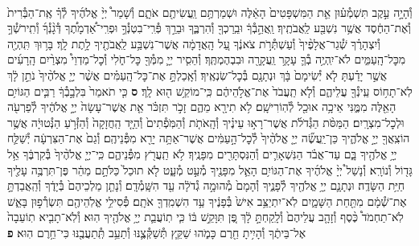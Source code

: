 \documentclass[twoside, openany, parskip=half, 11pt]{book}
\begin{document}
\begin{footnotesize}
\begin{multicols}{2}
\\
וְ֯הָיָ֣ה עֵ֣קֶב תִּשְׁמְ֯ע֗וּן אֵ֤ת הַמִּשְׁפָּטִים֙ הָאֵ֔לֶּה וּשְׁמַרְתֶּ֥ם וַֽעֲשִׂיתֶ֖ם אֹתָ֑ם וְ֯שָׁמַר֩ יְיָ֨ אֱלֹהֶ֜יךָ לְ֯ךָ֗ אֶֽת־הַבְּ֯רִית֙ וְ֯אֶת־הַחֶ֔סֶד אֲשֶׁ֥ר נִשְׁבַּ֖ע לַֽאֲבֹתֶֽיךָ׃ וַֽאֲהֵ֣בְ֯ךָ֔ וּבֵֽרַכְךָ֖ וְ֯הִרְבֶּ֑ךָ וּבֵרַ֣ךְ פְּ֯רִֽי־בִטְנְ֯ךָ֣ וּפְרִֽי־אַ֠דְמָתֶ֠ךָ דְּ֯גָ֨נְ֯ךָ֜ וְ֯תִֽירשְׁ֯ךָ֣ וְ֯יִצְהָרֶ֗ךָ שְׁ֯גַר־אֲלָפֶ֨יךָ֙ וְ֯עַשְׁתְּ֯רֹ֣ת צֹאנֶ֔ךָ עַ֚ל הָֽאֲדָמָ֔ה אֲשֶׁר־נִשְׁבַּ֥ע לַֽאֲבֹתֶ֖יךָ לָ֥תֶת לָֽךְ׃ בָּר֥וּךְ תִּֽהְיֶ֖ה מִכׇּל־הָֽעַמִּ֑ים לֹא־יִֽהְיֶ֥ה בְ֯ךָ֛ עָקָ֥ר וַֽעֲקָרָ֖ה וּבִבְהֶמְתֶּֽךָ׃ וְ֯הֵסִ֧יר יְיָ֛ מִמְּ֯ךָ֖ כׇּל־חֹ֑לִי וְ֯כׇל־מַדְוֵי֩ מִצְרַ֨יִם הָֽרָעִ֜ים אֲשֶׁ֣ר יָדַ֗עְתָּ לֹ֤א יְ֯שִׂימָם֙ בָּ֔ךְ וּנְתָנָ֖ם בְּ֯כׇל־שֽׂנְאֶֽיךָ׃ וְ֯אָֽכַלְתָּ֣ אֶת־כׇּל־הָֽעַמִּ֗ים אֲשֶׁ֨ר יְיָ֤ אֱלֹהֶ֨יךָ֙ נֹתֵ֣ן לָ֔ךְ לֹֽא־תָח֥וֹס עֵֽינְ֯ךָ֖ עֲלֵיהֶ֑ם וְ֯לֹ֤א תַֽעֲבֹד֙ אֶת־אֱלֹ֣הֵיהֶ֔ם כִּֽי־מוֹקֵ֥שׁ ה֖וּא לָֽךְ׃ \textbf{ס} כִּ֤י תֹאמַר֙ בִּלְבָ֣בְ֯ךָ֔ רַבִּ֛ים הַגּוֹיִ֥ם הָאֵ֖לֶּה מִמֶּ֑נִּי אֵיכָ֥ה אוּכַ֖ל לְ֯הֽוֹרִישָֽׁם׃ לֹ֥א תִירָ֖א מֵהֶ֑ם זָכֹ֣ר תִּזְכֹּ֗ר אֵ֤ת אֲשֶׁר־עָשָׂה֙ יְיָ֣ אֱלֹהֶ֔יךָ לְ֯פַרְעֹ֖ה וּלְכׇל־מִצְרָֽיִם׃ הַמַּסֹּ֨ת הַגְּ֯דֹלֹ֜ת אֲשֶׁר־רָא֣וּ עֵינֶ֗יךָ וְ֯הָֽאֹתֹ֤ת וְ֯הַמֹּֽפְ֯תִים֙ וְ֯הַיָּ֤ד הַֽחֲזָקָה֙ וְ֯הַזְּ֯רֹ֣עַ הַנְּ֯טוּיָ֔ה אֲשֶׁ֥ר הוֹצִֽאֲךָ֖ יְיָ֣ אֱלֹהֶ֑יךָ כֵּן־יַֽעֲשֶׂ֞ה יְיָ֤ אֱלֹהֶ֨יךָ֙ לְ֯כׇל־הָ֣עַמִּ֔ים אֲשֶׁר־אַתָּ֥ה יָרֵ֖א מִפְּ֯נֵיהֶֽם׃ וְ֯גַם֙ אֶת־הַצִּרְעָ֔ה יְ֯שַׁלַּ֛ח יְיָ֥ אֱלֹהֶ֖יךָ בָּ֑ם עַד־אֲבֹ֗ד הַנִּשְׁאָרִ֛ים וְ֯הַנִּסְתָּרִ֖ים מִפָּנֶֽיךָ׃ לֹ֥א תַֽעֲרֹ֖ץ מִפְּ֯נֵיהֶ֑ם כִּֽי־יְיָ֤ אֱלֹהֶ֨יךָ֙ בְּ֯קִרְבֶּ֔ךָ אֵ֥ל גָּד֖וֹל וְ֯נוֹרָֽא׃  וְ֯נָשַׁל֩ יְיָ֨ אֱלֹהֶ֜יךָ אֶת־הַגּוֹיִ֥ם הָאֵ֛ל מִפָּנֶ֖יךָ מְ֯עַ֣ט מְ֯עָ֑ט לֹ֤א תוּכַל֙ כַּלֹּתָ֣ם מַהֵ֔ר פֶּן־תִּרְבֶּ֥ה עָלֶ֖יךָ חַיַּ֥ת הַשָּׂדֶֽה׃ וּנְתָנָ֛ם יְיָ֥ אֱלֹהֶ֖יךָ לְ֯פָנֶ֑יךָ וְ֯הָמָם֙ מְ֯הוּמָ֣ה גְ֯דֹלָ֔ה עַ֖ד הִשָּֽׁמְ֯דָֽם׃ וְ֯נָתַ֤ן מַלְכֵיהֶם֙ בְּ֯יָדֶ֔ךָ וְ֯הַֽאֲבַדְתָּ֣ אֶת־שְׁ֯מָ֔ם מִתַּ֖חַת הַשָּׁמָ֑יִם לֹֽא־יִתְיַצֵּ֥ב אִישׁ֙ בְּ֯פָנֶ֔יךָ עַ֥ד הִשְׁמִֽדְךָ֖ אֹתָֽם׃ פְּ֯סִילֵ֥י אֱלֹֽהֵיהֶ֖ם תִּשְׂרְ֯פ֣וּן בָּאֵ֑שׁ לֹֽא־תַחְמֹד֩ כֶּ֨סֶף וְ֯זָהָ֤ב עֲלֵיהֶם֙ וְ֯לָֽקַחְתָּ֣ לָ֔ךְ פֶּ֚ן תִּוָּקֵ֣שׁ בּ֔וֹ כִּ֧י תֽוֹעֲבַ֛ת יְיָ֥ אֱלֹהֶ֖יךָ הֽוּא׃ וְ֯לֹֽא־תָבִ֤יא תֽוֹעֵבָה֙ אֶל־בֵּיתֶ֔ךָ וְ֯הָיִ֥יתָ חֵ֖רֶם כָּמֹ֑הוּ שַׁקֵּ֧ץ תְּ֯שַׁקְּ֯צֶ֛נּוּ וְ֯תַעֵ֥ב תְּֽ֯תַעֲבֶ֖נּוּ כִּי־חֵ֥רֶם הֽוּא׃ \textbf{פ}

\end{multicols}
\end{footnotesize}
\end{document}
